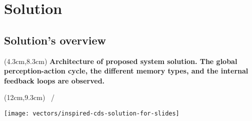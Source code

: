 \section{Solution}
\subsection{Solution's overview}
{\aauwavesbg%
\begin{frame}[plain]
  \begin{textblock*}{8.5cm}(4.3cm,8.3cm)
  \small
  \textbf{Architecture of proposed system solution. The global perception-action cycle, the different memory types, and the internal feedback loops are observed.}
  \end{textblock*}

  \begin{textblock*}{1cm}(12cm,9.3cm)
  \scriptsize
  \insertframenumber~/~\inserttotalframenumber
  \end{textblock*}

  \centering
  \texttt{[image: vectors/inspired-cds-solution-for-slides]}
\end{frame}}